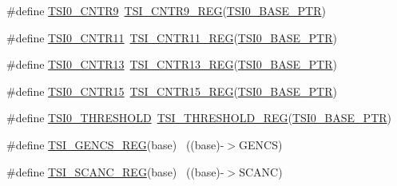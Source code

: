 \begin{DoxyCompactItemize}
\#define \hyperlink{group___t_s_i___register___accessor___macros_ga234b2beb5ea88d5bd810c7f8367e3a8e}{T\+S\+I0\+\_\+\+C\+N\+T\+R9}~\hyperlink{group___t_s_i___register___accessor___macros_ga47c15fa313e21645ab38cf808bd08abb}{T\+S\+I\+\_\+\+C\+N\+T\+R9\+\_\+\+R\+EG}(\hyperlink{group___t_s_i___peripheral_gaf98ea1cd15559446e0cfc1ae177751f6}{T\+S\+I0\+\_\+\+B\+A\+S\+E\+\_\+\+P\+TR})
\item 
\#define \hyperlink{group___t_s_i___register___accessor___macros_gaf22e0ff5c21b566851cc900b972f3a1e}{T\+S\+I0\+\_\+\+C\+N\+T\+R11}~\hyperlink{group___t_s_i___register___accessor___macros_gabb3ec6c9ffd38a29d4917c9c74047087}{T\+S\+I\+\_\+\+C\+N\+T\+R11\+\_\+\+R\+EG}(\hyperlink{group___t_s_i___peripheral_gaf98ea1cd15559446e0cfc1ae177751f6}{T\+S\+I0\+\_\+\+B\+A\+S\+E\+\_\+\+P\+TR})
\item 
\#define \hyperlink{group___t_s_i___register___accessor___macros_ga4ceecc7d3b2c95a0e7c8ca8e1c5a9ff9}{T\+S\+I0\+\_\+\+C\+N\+T\+R13}~\hyperlink{group___t_s_i___register___accessor___macros_ga4781f0cae7aee00361b1d6dd24ebb375}{T\+S\+I\+\_\+\+C\+N\+T\+R13\+\_\+\+R\+EG}(\hyperlink{group___t_s_i___peripheral_gaf98ea1cd15559446e0cfc1ae177751f6}{T\+S\+I0\+\_\+\+B\+A\+S\+E\+\_\+\+P\+TR})
\item 
\#define \hyperlink{group___t_s_i___register___accessor___macros_ga82d9eb7784107b55add2e6abc0e2ff2e}{T\+S\+I0\+\_\+\+C\+N\+T\+R15}~\hyperlink{group___t_s_i___register___accessor___macros_ga6999a403171b9b12a3caa9d5c0da77b6}{T\+S\+I\+\_\+\+C\+N\+T\+R15\+\_\+\+R\+EG}(\hyperlink{group___t_s_i___peripheral_gaf98ea1cd15559446e0cfc1ae177751f6}{T\+S\+I0\+\_\+\+B\+A\+S\+E\+\_\+\+P\+TR})
\item 
\#define \hyperlink{group___t_s_i___register___accessor___macros_gacb58ac9e8fdf37c03ddaf95985740d18}{T\+S\+I0\+\_\+\+T\+H\+R\+E\+S\+H\+O\+LD}~\hyperlink{group___t_s_i___register___accessor___macros_ga2eef7cbc055e4e7eead54c59a1bda753}{T\+S\+I\+\_\+\+T\+H\+R\+E\+S\+H\+O\+L\+D\+\_\+\+R\+EG}(\hyperlink{group___t_s_i___peripheral_gaf98ea1cd15559446e0cfc1ae177751f6}{T\+S\+I0\+\_\+\+B\+A\+S\+E\+\_\+\+P\+TR})
\item 
\#define \hyperlink{group___t_s_i___register___accessor___macros_gacb2292491464fa55b36996380b09077f}{T\+S\+I\+\_\+\+G\+E\+N\+C\+S\+\_\+\+R\+EG}(base)                                        ~((base)-\/$>$G\+E\+N\+CS)
\item 
\#define \hyperlink{group___t_s_i___register___accessor___macros_gaa04f34529d4fc762bc30470edc1d5f38}{T\+S\+I\+\_\+\+S\+C\+A\+N\+C\+\_\+\+R\+EG}(base)                                        ~((base)-\/$>$S\+C\+A\+NC)

\end{DoxyCompactItemize}
